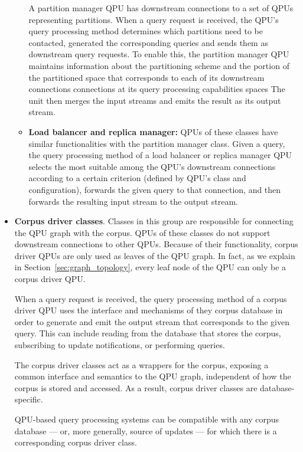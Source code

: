 \begin{itemize}
\begin{itemize}
    A partition manager QPU has downstream connections to a set of QPUs representing partitions.
    When a query request is received, the QPU's query processing method determines which partitions need to be contacted,
    generated the corresponding queries and sends them as downstream query requests.
    To enable this, the partition manager QPU maintains information about the partitioning scheme and the portion of
    the partitioned space that corresponds to each of its downstream connections connections at its query processing
    capabilities spaces
    The unit then merges the input streams and emits the result as its output stream.

    \item \textbf{Load balancer and replica manager:}
    QPUs of these classes have similar functionalities with the partition manager class.
    Given a query, the query processing method of a load balancer or replica manager QPU selects the most suitable
    among the QPU's downstream connections according to a certain criterion (defined by QPU's class and configuration),
    forwards the given query to that connection, and then forwards the resulting input stream to the output stream.
    \end{itemize}

  \item \textbf{Corpus driver classes}.
  Classes in this group are responsible for connecting the QPU graph with the corpus.
  QPUs of these classes do not support downstream connections to other QPUs.
  Because of their functionality, corpus driver QPUs are only used as leaves of the QPU graph.
  In fact, as we explain in Section~\ref{sec:graph_topology}, every leaf node of the QPU can only be a corpus driver QPU.

  When a query request is received, the query processing method of a corpus driver QPU uses the interface and mechanisms
  of they corpus database in order to generate and emit the output stream that corresponds to the given query.
  This can include reading from the database that stores the corpus, subscribing to update notifications,
  or performing queries.

  The corpus driver classes act as a wrappers for the corpus, exposing a common interface and semantics to the
  QPU graph, independent of how the corpus is stored and accessed.
  As a result, corpus driver classes are database-specific.

  QPU-based query processing systems can be compatible with any corpus database --- or, more generally, source of updates ---
  for which there is a corresponding corpus driver class.
\end{itemize}

